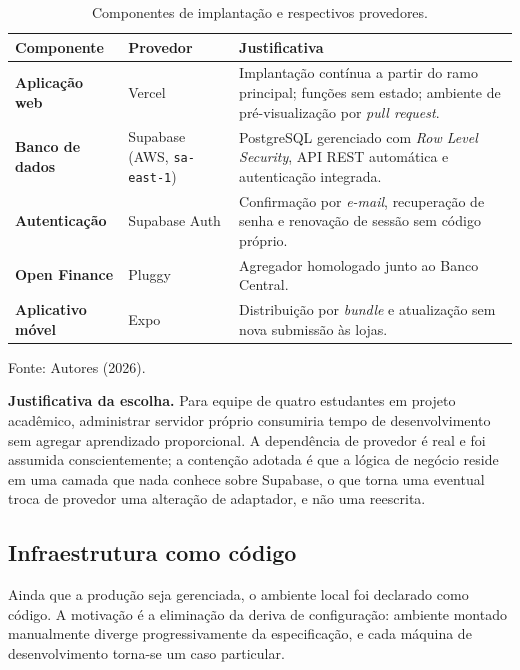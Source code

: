 \documentclass[12pt,a4paper]{article}
\begin{document}
\begin{table}[H]
\centering
\caption{Componentes de implantação e respectivos provedores.}
\label{tab:nuvem}
\renewcommand{\arraystretch}{1.4}
\begin{tabularx}{\textwidth}{@{}>{\bfseries\RaggedRight}p{3.2cm}>{\RaggedRight}p{3cm}>{\RaggedRight\arraybackslash}X@{}}
\toprule
\normalfont\textbf{Componente} & \textbf{Provedor} & \textbf{Justificativa} \\
\midrule
Aplicação web & Vercel & Implantação contínua a partir do ramo principal; funções sem estado; ambiente de pré-visualização por \textit{pull request}. \\
Banco de dados & Supabase (AWS, \texttt{sa-east-1}) & PostgreSQL gerenciado com \textit{Row Level Security}, API REST automática e autenticação integrada. \\
Autenticação & Supabase Auth & Confirmação por \textit{e-mail}, recuperação de senha e renovação de sessão sem código próprio. \\
Open Finance & Pluggy & Agregador homologado junto ao Banco Central. \\
Aplicativo móvel & Expo & Distribuição por \textit{bundle} e atualização sem nova submissão às lojas. \\
\bottomrule
\end{tabularx}
\vspace{0.3cm}

\noindent\footnotesize Fonte: Autores (2026).
\end{table}

\textbf{Justificativa da escolha.} Para equipe de quatro estudantes em projeto acadêmico, administrar servidor próprio consumiria tempo de desenvolvimento sem agregar aprendizado proporcional. A dependência de provedor é real e foi assumida conscientemente; a contenção adotada é que a lógica de negócio reside em uma camada que nada conhece sobre Supabase, o que torna uma eventual troca de provedor uma alteração de adaptador, e não uma reescrita.

\subsection{Infraestrutura como código}

Ainda que a produção seja gerenciada, o ambiente local foi declarado como código. A motivação é a eliminação da deriva de configuração: ambiente montado manualmente diverge progressivamente da especificação, e cada máquina de desenvolvimento torna-se um caso particular.
\end{document}
